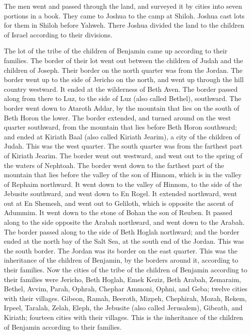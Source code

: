  The men went and passed through the land, and surveyed it
by cities into seven portions in a book. They came to Joshua to the camp
at Shiloh.  Joshua cast lots for them in Shiloh before
Yahweh. There Joshua divided the land to the children of Israel
according to their divisions.

 The lot of the tribe of the children of Benjamin came up
according to their families. The border of their lot went out between
the children of Judah and the children of Joseph.  Their
border on the north quarter was from the Jordan. The border went up to
the side of Jericho on the north, and went up through the hill country
westward. It ended at the wilderness of Beth Aven.  The
border passed along from there to Luz, to the side of Luz (also called
Bethel), southward. The border went down to Ataroth Addar, by the
mountain that lies on the south of Beth Horon the lower. 
The border extended, and turned around on the west quarter southward,
from the mountain that lies before Beth Horon southward; and ended at
Kiriath Baal (also called Kiriath Jearim), a city of the children of
Judah. This was the west quarter.  The south quarter was
from the farthest part of Kiriath Jearim. The border went out westward,
and went out to the spring of the waters of Nephtoah.  The
border went down to the farthest part of the mountain that lies before
the valley of the son of Hinnom, which is in the valley of Rephaim
northward. It went down to the valley of Hinnom, to the side of the
Jebusite southward, and went down to En Rogel.  It extended
northward, went out at En Shemesh, and went out to Geliloth, which is
opposite the ascent of Adummim. It went down to the stone of Bohan the
son of Reuben.  It passed along to the side opposite the
Arabah northward, and went down to the Arabah.  The border
passed along to the side of Beth Hoglah northward; and the border ended
at the north bay of the Salt Sea, at the south end of the Jordan. This
was the south border.  The Jordan was its border on the
east quarter. This was the inheritance of the children of Benjamin, by
the borders around it, according to their families.  Now
the cities of the tribe of the children of Benjamin according to their
families were Jericho, Beth Hoglah, Emek Keziz,  Beth
Arabah, Zemaraim, Bethel,  Avvim, Parah, Ophrah,
 Chephar Ammoni, Ophni, and Geba; twelve cities with their
villages.  Gibeon, Ramah, Beeroth,  Mizpeh,
Chephirah, Mozah,  Rekem, Irpeel, Taralah, 
Zelah, Eleph, the Jebusite (also called Jerusalem), Gibeath, and
Kiriath; fourteen cities with their villages. This is the inheritance of
the children of Benjamin according to their families.

